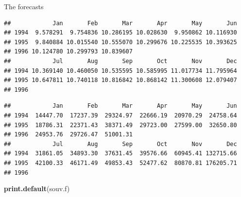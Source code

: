 \documentclass[
  ignorenonframetext,
]{beamer}
\newenvironment{Shaded}{\begin{snugshade}}{\end{snugshade}}
\newcommand{\KeywordTok}[1]{\textcolor[rgb]{0.13,0.29,0.53}{\textbf{#1}}}
\newcommand{\NormalTok}[1]{#1}
\newcommand{\OperatorTok}[1]{\textcolor[rgb]{0.81,0.36,0.00}{\textbf{#1}}}
\begin{document}
\begin{frame}[fragile]{The forecasts}
\begin{Shaded}
\end{Shaded}

\begin{verbatim}
##            Jan       Feb       Mar       Apr       May       Jun
## 1994  9.578291  9.754836 10.286195 10.028630  9.950862 10.116930
## 1995  9.840884 10.015540 10.555070 10.299676 10.225535 10.393625
## 1996 10.124780 10.299793 10.839607                              
##            Jul       Aug       Sep       Oct       Nov       Dec
## 1994 10.369140 10.460050 10.535595 10.585995 11.017734 11.795964
## 1995 10.647811 10.740118 10.816842 10.868142 11.300608 12.079407
## 1996
\end{verbatim}

\begin{Shaded}
\end{Shaded}

\begin{verbatim}
##            Jan       Feb       Mar       Apr       May       Jun
## 1994  14447.70  17237.39  29324.97  22666.19  20970.29  24758.64
## 1995  18786.31  22371.43  38371.49  29723.00  27599.00  32650.80
## 1996  24953.76  29726.47  51001.31                              
##            Jul       Aug       Sep       Oct       Nov       Dec
## 1994  31861.05  34893.30  37631.45  39576.66  60945.41 132715.66
## 1995  42100.33  46171.49  49853.43  52477.62  80870.81 176205.71
## 1996
\end{verbatim}

\begin{Shaded}
\begin{Highlighting}[]
\KeywordTok{print.default}\NormalTok{(souv.f)}
\end{Highlighting}
\end{Shaded}


\end{frame}
\end{document}
